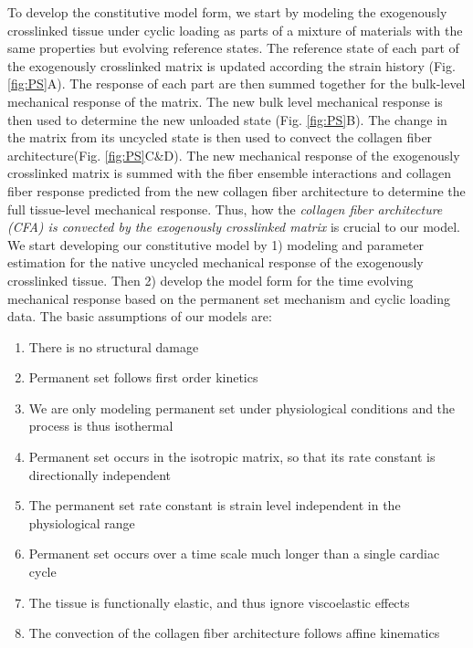 	To develop the constitutive model form, we start by modeling the exogenously crosslinked tissue under cyclic loading as parts of a mixture of materials with the same properties but evolving reference states. 
	The reference state of each part of the exogenously crosslinked matrix is updated according the strain history (Fig. \ref{fig:PS}A). 
	The response of each part are then summed together for the bulk-level mechanical response of the matrix.
	The new bulk level mechanical response is then used to determine the new unloaded state (Fig. \ref{fig:PS}B).
	The change in the matrix from its uncycled state is then used to convect the collagen fiber architecture(Fig. \ref{fig:PS}C\&D). 
The new mechanical response of the exogenously crosslinked matrix is summed with the fiber ensemble interactions and collagen fiber response predicted from the new collagen fiber architecture to determine the full tissue-level mechanical response. 
Thus, how the \emph{collagen fiber architecture (CFA) is convected by the exogenously crosslinked matrix} is crucial to our model.
We start developing our constitutive model by 1) modeling and parameter estimation for the native uncycled mechanical response of the exogenously crosslinked tissue. 
Then 2) develop the model form for the time evolving mechanical response based on the permanent set mechanism and cyclic loading data. The basic assumptions of our models are:
\begin{enumerate}
\item There is no structural damage
\item Permanent set follows first order kinetics
\item We are only modeling permanent set under physiological conditions and the process is thus isothermal
\item Permanent set occurs in the isotropic matrix, so that its rate constant is directionally independent
\item The permanent set rate constant is strain level independent in the physiological range
\item Permanent set occurs over a time scale much longer than a single cardiac cycle
\item The tissue is functionally elastic, and thus ignore viscoelastic effects
\item The convection of the collagen fiber architecture follows affine kinematics \cite{lee_presence_2015}
\end{enumerate}